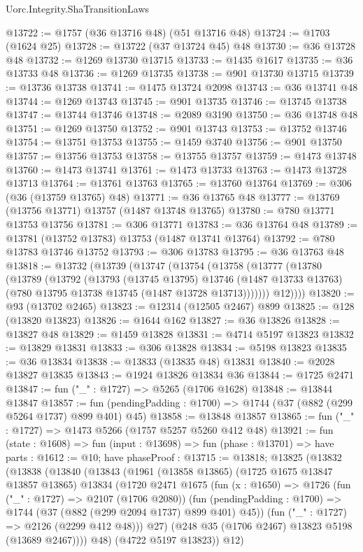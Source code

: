 \begin{lexlean}{Uorc.Integrity.ShaTransitionLaws}
\begin{coremodule}
@13722 := @1757 (@36 @13716 @48) (@51 @13716 @48)
@13724 := @1703 (@1624 @25)
@13728 := @13722 (@37 @13724 @45) @48
@13730 := @36 @13728 @48
@13732 := @1269 @13730 @13715
@13733 := @1435 @1617
@13735 := @36 @13733 @48
@13736 := @1269 @13735
@13738 := @901 @13730 @13715
@13739 := @13736 @13738
@13741 := @1475 @13724 @2098
@13743 := @36 @13741 @48
@13744 := @1269 @13743
@13745 := @901 @13735
@13746 := @13745 @13738
@13747 := @13744 @13746
@13748 := @2089 @3190
@13750 := @36 @13748 @48
@13751 := @1269 @13750
@13752 := @901 @13743
@13753 := @13752 @13746
@13754 := @13751 @13753
@13755 := @1459 @3740
@13756 := @901 @13750
@13757 := @13756 @13753
@13758 := @13755 @13757
@13759 := @1473 @13748
@13760 := @1473 @13741
@13761 := @1473 @13733
@13763 := @1473 @13728 @13713
@13764 := @13761 @13763
@13765 := @13760 @13764
@13769 := @306 (@36 (@13759 @13765) @48)
@13771 := @36 @13765 @48
@13777 := @13769 (@13756 @13771) @13757 (@1487 @13748 @13765)
@13780 := @780 @13771 @13753 @13756
@13781 := @306 @13771
@13783 := @36 @13764 @48
@13789 := @13781 (@13752 @13783) @13753 (@1487 @13741 @13764)
@13792 := @780 @13783 @13746 @13752
@13793 := @306 @13783
@13795 := @36 @13763 @48
@13818 := @13732
    (@13739
      (@13747
        (@13754
          (@13758
            (@13777
              (@13780
                (@13789
                  (@13792
                    (@13793
                      (@13745 @13795)
                      @13746
                      (@1487 @13733 @13763)
                      (@780 @13795 @13738 @13745 (@1487 @13728 @13713)))))))
            @12))))
@13820 := @93 (@13702 @2465)
@13823 := @12314 (@12505 @2467) @899
@13825 := @128 (@13820 @13823)
@13826 := @1644 @162
@13827 := @36 @13826
@13828 := @13827 @48
@13829 := @1459 @13828
@13831 := @4714 @5197 @13823
@13832 := @13829 @13831
@13833 := @306 @13828
@13834 := @5198 @13823
@13835 := @36 @13834
@13838 := @13833 (@13835 @48) @13831
@13840 := @2028 @13827 @13835
@13843 := @1924 @13826 @13834 @36
@13844 := @1725 @2471
@13847 := fun ("_" : @1727) => @5265 (@1706 @1628)
@13848 := @13844 @13847
@13857 := fun (pendingPadding : @1700) => @1744 (@37 (@882 (@299 @5264 @1737) @899 @401) @45)
@13858 := @13848 @13857
@13865 := fun ("_" : @1727) => @1473 @5266 (@1757 @5257 @5260 @412 @48)
@13921 := fun (state : @1608) =>
  fun (input : @13698) =>
  fun (phase : @13701) =>
  have parts : @1612 := @10;
  have phaseProof : @13715 := @13818;
  @13825
    (@13832
      (@13838
        (@13840
          (@13843
            (@1961
              (@13858 @13865)
              (@1725 @1675 @13847 @13857 @13865)
              @13834
              (@1720
                @2471
                @1675
                (fun (x : @1650) =>
                @1726
                  (fun ("_" : @1727) => @2107 (@1706 @2080))
                  (fun (pendingPadding : @1700) =>
                  @1744 (@37 (@882 (@299 @2094 @1737) @899 @401) @45))
                  (fun ("_" : @1727) => @2126 (@2299 @412 @48)))
                @27)
              (@248 @35 (@1706 @2467) @13823 @5198 (@13689 @2467))))
          @48)
        (@4722 @5197 @13823))
      @12)
\end{coremodule}
\end{lexlean}
